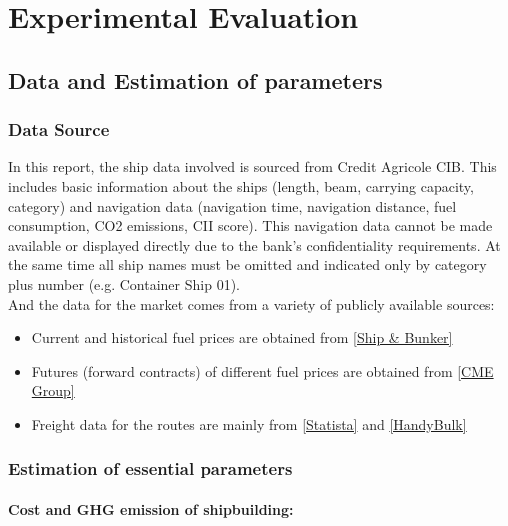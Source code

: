 \documentclass[a4paper,12pt]{article}
\begin{document}
\section{Experimental Evaluation}

\subsection{Data and Estimation of parameters}

\subsubsection{Data Source}
In this report, the ship data involved is sourced from Credit Agricole CIB. This includes basic information about the ships (length, beam, carrying capacity, category) and navigation data (navigation time, navigation distance, fuel consumption, CO2 emissions, CII score).
This navigation data cannot be made available or displayed directly due to the bank's confidentiality requirements.
At the same time all ship names must be omitted and indicated only by category plus number (e.g. Container Ship 01).\\


And the data for the market comes from a variety of publicly available sources:
\begin{itemize}
	\item Current and historical fuel prices are obtained from \href{https://shipandbunker.com/prices}{[Ship \& Bunker]}
	\item Futures (forward contracts) of different fuel prices are obtained from \href{https://www.cmegroup.com/markets/energy/refined-products/mini-european-fob-rdam-marine-fuel-05-barges-platts.html}{[CME Group]}
	\item Freight data for the routes are mainly from \href{https://www.statista.com/statistics/1313360/container-freight-index-shanghai-rotterdam}{[Statista]} and \href{https://www.handybulk.com/ship-charter-rates/}{[HandyBulk]}
\end{itemize}

\subsubsection{Estimation of essential parameters}

\paragraph{Cost and GHG emission of shipbuilding:}
\end{document}
